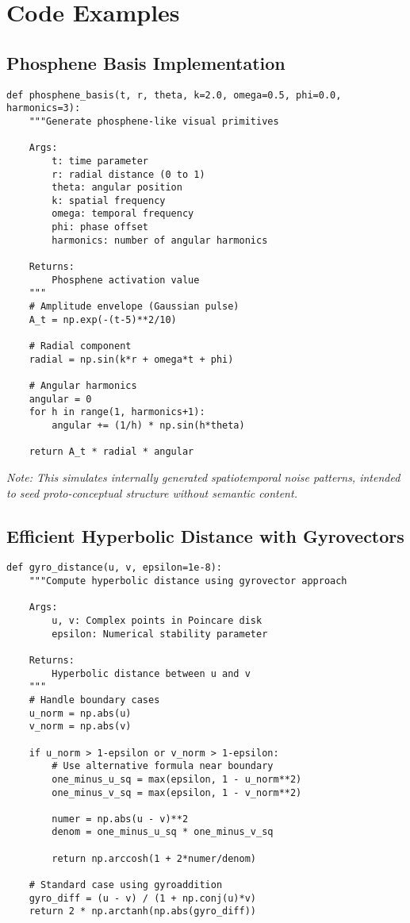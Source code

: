 \documentclass[10pt]{article}
\begin{document}
\section{Code Examples}

\subsection{Phosphene Basis Implementation}

\begin{lstlisting}[caption={Phosphene Basis Function}]
def phosphene_basis(t, r, theta, k=2.0, omega=0.5, phi=0.0, harmonics=3):
    """Generate phosphene-like visual primitives
    
    Args:
        t: time parameter
        r: radial distance (0 to 1)
        theta: angular position
        k: spatial frequency
        omega: temporal frequency
        phi: phase offset
        harmonics: number of angular harmonics
    
    Returns:
        Phosphene activation value
    """
    # Amplitude envelope (Gaussian pulse)
    A_t = np.exp(-(t-5)**2/10)
    
    # Radial component
    radial = np.sin(k*r + omega*t + phi)
    
    # Angular harmonics
    angular = 0
    for h in range(1, harmonics+1):
        angular += (1/h) * np.sin(h*theta)
    
    return A_t * radial * angular
\end{lstlisting}

\textit{Note: This simulates internally generated spatiotemporal noise patterns, intended to seed proto-conceptual structure without semantic content.}

\subsection{Efficient Hyperbolic Distance with Gyrovectors}

\begin{lstlisting}[caption={Gyrovector Distance Function}]
def gyro_distance(u, v, epsilon=1e-8):
    """Compute hyperbolic distance using gyrovector approach
    
    Args:
        u, v: Complex points in Poincare disk
        epsilon: Numerical stability parameter
    
    Returns:
        Hyperbolic distance between u and v
    """
    # Handle boundary cases
    u_norm = np.abs(u)
    v_norm = np.abs(v)
    
    if u_norm > 1-epsilon or v_norm > 1-epsilon:
        # Use alternative formula near boundary
        one_minus_u_sq = max(epsilon, 1 - u_norm**2)
        one_minus_v_sq = max(epsilon, 1 - v_norm**2)
        
        numer = np.abs(u - v)**2
        denom = one_minus_u_sq * one_minus_v_sq
        
        return np.arccosh(1 + 2*numer/denom)
    
    # Standard case using gyroaddition
    gyro_diff = (u - v) / (1 + np.conj(u)*v)
    return 2 * np.arctanh(np.abs(gyro_diff))
\end{lstlisting}
\end{document}
